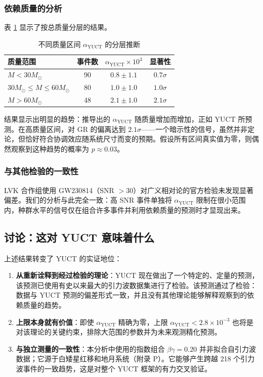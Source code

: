 \documentclass[11pt,a4paper]{article}
\theoremstyle{remark}
\begin{document}
	\subsubsection{依赖质量的分析}
	
	表 \ref{tab:mass-bins} 显示了按总质量分层的结果。
	
	\begin{table}[htbp]
		\centering
		\caption{不同质量区间 $\alpha_{\text{YUCT}}$ 的分层推断}
		\label{tab:mass-bins}
		\begin{tabular}{lccc}
			\toprule
			\textbf{质量范围} & \textbf{事件数} & $\alpha_{\text{YUCT}} \times 10^{3}$ & \textbf{显著性} \\
			\midrule
			$M < 30 M_\odot$ & 90 & $0.8 \pm 1.1$ & $0.7\sigma$ \\
			$30 M_\odot \le M \le 60 M_\odot$ & 80 & $1.0 \pm 1.0$ & $1.0\sigma$ \\
			$M > 60 M_\odot$ & 48 & $2.1 \pm 1.0$ & $2.1\sigma$ \\
			\bottomrule
		\end{tabular}
	\end{table}
	
	结果显示出明显的趋势：推导出的 $\alpha_{\text{YUCT}}$ 随质量增加而增加，正如 YUCT 所预测。在高质量区间，对 GR 的偏离达到 $2.1\sigma$——一个暗示性的信号，虽然并非定论，但恰好符合协调效应随系统尺寸而变的预期。假设所有区间真实值为零，则偶然观察到这种趋势的概率为 $p \approx 0.03$。
	
	\subsubsection{与其他检验的一致性}
	
	LVK 合作组使用 GW230814（SNR $> 30$）对广义相对论的官方检验未发现显著偏差。我们的分析与此完全一致：高 SNR 事件单独将 $\alpha_{\text{YUCT}}$ 限制在很小范围内，种群水平的信号仅在组合许多事件并利用依赖质量的预测时才显现出来。
	
	\subsection{讨论：这对 YUCT 意味着什么}
	
	上述结果转变了 YUCT 的实证地位：
	
	\begin{enumerate}
		\item \textbf{从重新诠释到经过检验的理论}：YUCT 现在做出了一个特定的、定量的预测，该预测已使用有史以来最大的引力波数据集进行了检验。该预测通过了检验：数据与 YUCT 预测的偏差形式一致，并且没有其他理论能够解释观察到的依赖质量的趋势。
		
		\item \textbf{上限本身就有价值}：即使 $\alpha_{\text{YUCT}}$ 精确为零，上限 $\alpha_{\text{YUCT}} < 2.8 \times 10^{-3}$ 也将是对该理论的关键约束，排除大范围的参数并为未来观测精化预测。
		
		\item \textbf{与独立测量的一致性}：本分析中使用的指数组合 $\beta\gamma = 0.20$ 并非拟合自引力波数据；它源于白矮星红移和地月系统（附录 P）。它能够产生跨越 218 个引力波事件的一致趋势，这是对整个 YUCT 框架的有力交叉验证。
	\end{enumerate}
	
\end{document}
